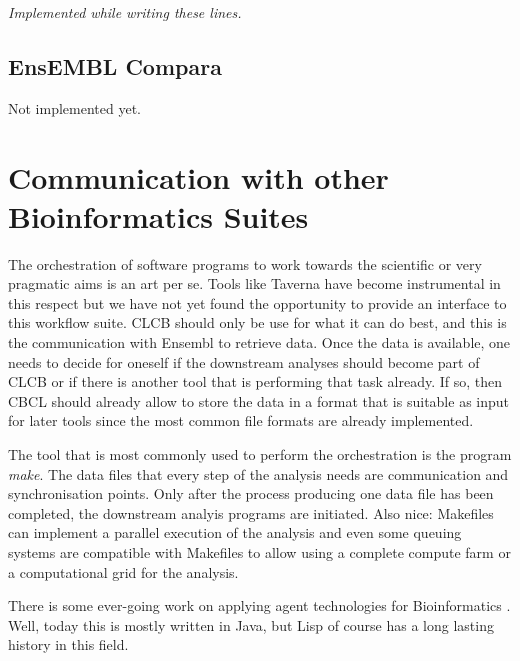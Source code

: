 \documentclass{book}
\newcommand\ensembl{EnsEMBL }
\newcommand\CLCB{CLCB }
\begin{document}
{\em Implemented while writing these lines.}

\subsection{\ensembl Compara}

Not implemented yet.

\section{Communication with other Bioinformatics Suites}

The orchestration of software programs to work towards the scientific
or very pragmatic aims is an art per se. Tools like Taverna have become
instrumental in this respect but we have not yet found the opportunity
to provide an interface to this workflow suite. \CLCB should only be
use for what it can do best, and this is the communication with Ensembl
to retrieve data. Once the data is available, one needs to decide for
oneself if the downstream analyses should become part of \CLCB or if
there is another tool that is performing that task already. If so,
then CBCL should already allow to store the data in a format that is
suitable as input for later tools since the most common file formats
are already implemented.

The tool that is most commonly used to perform the orchestration is 
the program {\em make}. The data files that every step of the analysis needs
are communication and synchronisation points. Only after the process producing one
data file has been completed, the downstream analyis programs are initiated.
Also nice: Makefiles can implement a parallel execution of the analysis and 
even some queuing systems are compatible with Makefiles to allow using a complete
compute farm or a computational grid for the analysis.

There is some ever-going work on applying agent technologies for
Bioinformatics \cite{agents:2007}. Well, today this is mostly written
in Java, but Lisp of course has a long lasting history in this field.



\end{document}
